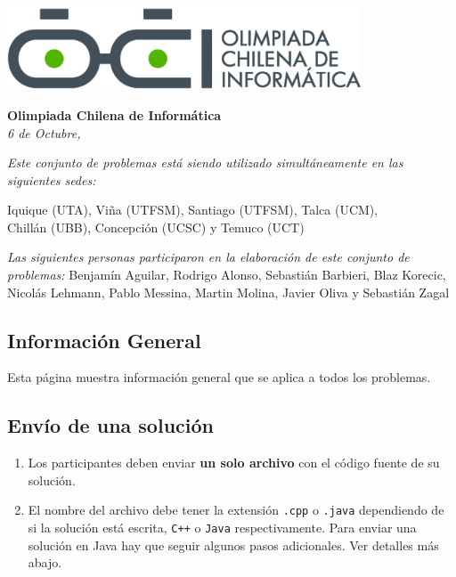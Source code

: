 \documentclass[12pt]{oci}
\begin{document}
  \begin{center}
  \includegraphics[height=70pt]{logo.eps}

  \vskip 70pt
  \Large{\bf Olimpiada Chilena de Inform\'atica\\ \the\year}
  \vskip 10pt
  \large{\phase}
  \vskip 10pt
  \normalsize{\it 6 de Octubre, \the\year}

  \vskip 85pt

  \emph{Este conjunto de problemas está siendo utilizado simultáneamente en las siguientes sedes:}
  \vskip 10pt

  Iquique (UTA), Viña (UTFSM), Santiago (UTFSM), Talca (UCM), \\
  Chill\'an (UBB), Concepci\'on (UCSC) y Temuco (UCT)

  \vskip 60pt

  \emph{Las siguientes personas participaron en la elaboración de este conjunto
    de problemas:}
  \vskip 10pt
  Benjamín Aguilar, Rodrigo Alonso, Sebastián Barbieri,
  \vskip 0.5pt
  Blaz Korecic, Nicolás Lehmann, Pablo Messina,
  \vskip 0.5pt
  Martin Molina, Javier Oliva y Sebastián Zagal
  \end{center}
\cleardoublepage


\subsection*{Información General}

Esta página muestra información general que se aplica a todos los problemas.

\subsection*{Envío de una solución}

\begin{enumerate}
\item Los participantes deben enviar {\bf un solo archivo} con el código fuente de su solución.
\item El nombre del archivo debe tener la extensión \verb+.cpp+ o
  \verb+.java+ dependiendo de si la solución está escrita,
  \verb|C++| o \verb|Java| respectivamente.
Para enviar una solución en Java hay que seguir algunos pasos adicionales. Ver detalles más abajo.
\end{enumerate}
\end{document}

